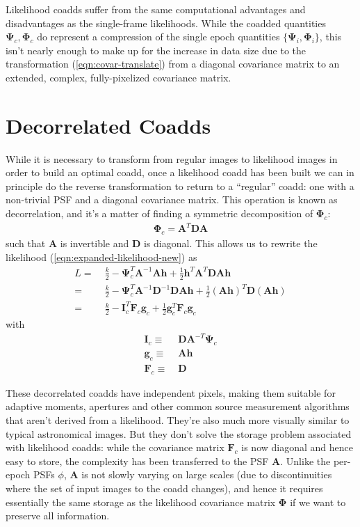 \documentclass[10pt]{article}
\newcommand{\eqnref}[1]{(\ref{eqn:#1})}
\begin{document}
Likelihood coadds suffer from the same computational advantages and disadvantages as the single-frame likelihoods.  While the coadded quantities $\bm{\Psi}_c,\bm{\Phi}_c$ do represent a compression of the single epoch quantities $\{\bm{\Psi}_i,\bm{\Phi}_i\}$, this isn't nearly enough to make up for the increase in data size due to the transformation \eqnref{covar-translate} from a diagonal covariance matrix to an extended, complex, fully-pixelized covariance matrix.

\section{Decorrelated Coadds}
\label{sec:decorrelated-coadds}

While it is necessary to transform from regular images to likelihood images in order to build an optimal coadd, once a likelihood coadd has been built we can in principle do the reverse transformation to return to a ``regular'' coadd: one with a non-trivial PSF and a diagonal covariance matrix.  This operation is known as decorrelation, and it's a matter of finding a symmetric decomposition of $\bm{\Phi}_c$:
\begin{align}
\bm{\Phi}_c = \bm{A}^T \bm{D} \bm{A}
\label{eqn:decorrelate-factorization}
\end{align}
such that $\bm{A}$ is invertible and $\bm{D}$ is diagonal.  This allows us to rewrite the likelihood \eqnref{expanded-likelihood-new} as
\begin{align}
L
=\;& \frac{k}{2} - \bm{\Psi}_c^T\!\bm{A}^{-1}\!\bm{A}\bm{h}
    + \frac{1}{2}\bm{h}^T\!\bm{A}^T\!\bm{D}\bm{A}\bm{h}\\
=\;& \frac{k}{2} - \bm{\Psi}_c^T\!\bm{A}^{-1}\bm{D}^{-1}\!\bm{D}\bm{A}\bm{h}
    + \frac{1}{2}\left(\bm{A}\bm{h}\right)^T\!\bm{D}\left(\bm{A}\bm{h}\right)
    \\
=\;& \frac{k}{2} - \bm{I}_c^T\!\bm{F}_c\bm{g}_c
    + \frac{1}{2}\bm{g}_c^T\!\bm{F}_c\bm{g}_c
\label{eqn:likelihood-decorrelated}
\end{align}
with
\begin{align}
\bm{I}_c \equiv\;& \bm{D}\bm{A}^{-T}\bm{\Psi}_c \\
\bm{g}_c \equiv\;& \bm{A}\bm{h} \\
\bm{F}_c \equiv\;& \bm{D}
\end{align}

These decorrelated coadds have independent pixels, making them suitable for adaptive moments, apertures and other common source measurement algorithms that aren't derived from a likelihood.  They're also much more visually similar to typical astronomical images.  But they don't solve the storage problem associated with likelihood coadds: while the covariance matrix $\bm{F}_c$ is now diagonal and hence easy to store, the complexity has been transferred to the PSF $\bm{A}$.  Unlike the per-epoch PSFs $\phi$, $\bm{A}$ is not slowly varying on large scales (due to discontinuities where the set of input images to the coadd changes), and hence it requires essentially the same storage as the likelihood covariance matrix $\bm{\Phi}$ if we want to preserve all information.
\end{document}

